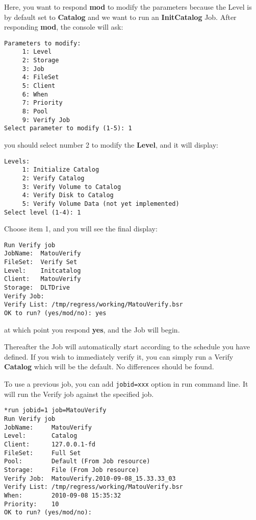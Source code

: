 Here, you want to respond {\bf mod} to modify the parameters because the Level
is by default set to {\bf Catalog} and we want to run an {\bf InitCatalog}
Job. After responding {\bf mod}, the console will ask: 

\footnotesize
\begin{verbatim}
Parameters to modify:
     1: Level
     2: Storage
     3: Job
     4: FileSet
     5: Client
     6: When
     7: Priority
     8: Pool
     9: Verify Job
Select parameter to modify (1-5): 1
\end{verbatim}
\normalsize

you should select number 2 to modify the {\bf Level}, and it will display: 

\footnotesize
\begin{verbatim}
Levels:
     1: Initialize Catalog
     2: Verify Catalog
     3: Verify Volume to Catalog
     4: Verify Disk to Catalog
     5: Verify Volume Data (not yet implemented)
Select level (1-4): 1
\end{verbatim}
\normalsize

Choose item 1, and you will see the final display: 

\footnotesize
\begin{verbatim}
Run Verify job
JobName:  MatouVerify
FileSet:  Verify Set
Level:    Initcatalog
Client:   MatouVerify
Storage:  DLTDrive
Verify Job:  
Verify List: /tmp/regress/working/MatouVerify.bsr
OK to run? (yes/mod/no): yes
\end{verbatim}
\normalsize

at which point you respond {\bf yes}, and the Job will begin. 

Thereafter the Job will automatically start according to the schedule you
have defined. If you wish to immediately verify it, you can simply run a
Verify {\bf Catalog} which will be the default. No differences should be
found. 

To use a previous job, you can add \texttt{jobid=xxx} option in run command
line. It will run the Verify job against the specified job.

\begin{verbatim}
*run jobid=1 job=MatouVerify
Run Verify job
JobName:     MatouVerify
Level:       Catalog
Client:      127.0.0.1-fd
FileSet:     Full Set
Pool:        Default (From Job resource)
Storage:     File (From Job resource)
Verify Job:  MatouVerify.2010-09-08_15.33.33_03
Verify List: /tmp/regress/working/MatouVerify.bsr
When:        2010-09-08 15:35:32
Priority:    10
OK to run? (yes/mod/no): 
\end{verbatim}


